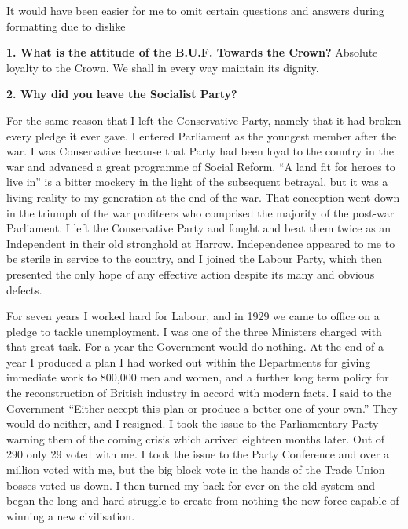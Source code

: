\documentclass{book}
\begin{document}
It would have been easier for me to omit certain questions and answers during formatting due to dislike
\newpage
{}
\pagestyle{plain}
\pagecolor{white}
\color{black}
\begin{flushright}
\textbf{1. What is the attitude of the B.U.F. Towards the Crown?}
Absolute loyalty to the Crown. We shall in every way maintain its
dignity.
\end{flushright}
\begin{flushleft}
\textbf{2. Why did you leave the Socialist Party?}

For the same reason that I left the Conservative Party, namely that it had broken every pledge it
ever gave. I entered Parliament as the youngest member after the war. I was Conservative
because that Party had been loyal to the country in the war and advanced a great programme of
Social Reform. ``A land fit for heroes to live in'' is a bitter mockery in the light of the subsequent
betrayal, but it was a living reality to my generation at the end of the war. That conception went
down in the triumph of the war profiteers who comprised the majority of the post-war Parliament.
I left the Conservative Party and fought and beat them twice as an Independent in their old
stronghold at Harrow. Independence appeared to me to be sterile in service to the country, and I
joined the Labour Party, which then presented the only hope of any effective action despite its
many and obvious defects.

For seven years I worked hard for Labour, and in 1929 we came to office on a pledge to tackle
unemployment. I was one of the three Ministers charged with that great task. For a year the
Government would do nothing. At the end of a year I produced a plan I had worked out within
the Departments for giving immediate work to 800,000 men and women, and a further long term
policy for the reconstruction of British industry in accord with modern facts. I said to the
Government ``Either accept this plan or produce a better one of your own.'' They would do
neither, and I resigned. I took the issue to the Parliamentary Party warning them of the coming
crisis which arrived eighteen months later. Out of 290 only 29 voted with me. I took the issue to
the Party Conference and over a million voted with me, but the big block vote in the hands of the
Trade Union bosses voted us down. I then turned my back for ever on the old system and began
the long and hard struggle to create from nothing the new force capable of winning a new
civilisation.


\end{flushleft}
\end{document}
